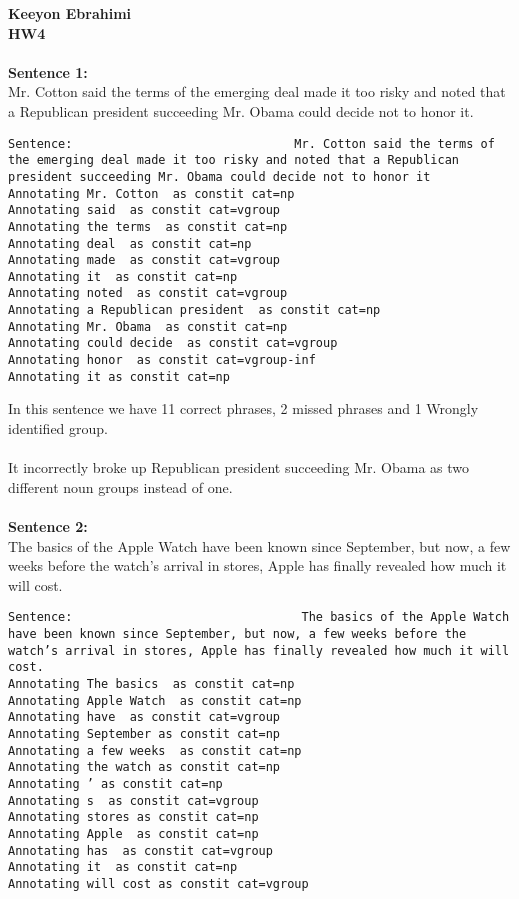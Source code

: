 \documentclass{article}
\begin{document}
\textbf{Keeyon Ebrahimi}\\
\textbf{HW4}
\\ \\
\textbf{Sentence 1: } \\
Mr. Cotton said the terms of the emerging deal made it too risky and noted that a Republican president succeeding Mr. Obama could decide not to honor it.
\begin{verbatim}
Sentence:                               Mr. Cotton said the terms of the emerging deal made it too risky and noted that a Republican president succeeding Mr. Obama could decide not to honor it
Annotating Mr. Cotton  as constit cat=np
Annotating said  as constit cat=vgroup
Annotating the terms  as constit cat=np
Annotating deal  as constit cat=np
Annotating made  as constit cat=vgroup
Annotating it  as constit cat=np
Annotating noted  as constit cat=vgroup
Annotating a Republican president  as constit cat=np
Annotating Mr. Obama  as constit cat=np
Annotating could decide  as constit cat=vgroup
Annotating honor  as constit cat=vgroup-inf
Annotating it as constit cat=np

\end{verbatim}
In this sentence we have 11 correct phrases, 2 missed phrases and 1 Wrongly identified group.
\\ \\
It incorrectly broke up Republican president succeeding Mr. Obama as two different noun groups instead of one.
\\
\\
\textbf{Sentence 2: }\\
 The basics of the Apple Watch have been known since September, but now, a few weeks before the watch’s arrival in stores, Apple has finally revealed how much it will cost.
\begin{verbatim}
Sentence:                                The basics of the Apple Watch have been known since September, but now, a few weeks before the watch’s arrival in stores, Apple has finally revealed how much it will cost.
Annotating The basics  as constit cat=np
Annotating Apple Watch  as constit cat=np
Annotating have  as constit cat=vgroup
Annotating September as constit cat=np
Annotating a few weeks  as constit cat=np
Annotating the watch as constit cat=np
Annotating ’ as constit cat=np
Annotating s  as constit cat=vgroup
Annotating stores as constit cat=np
Annotating Apple  as constit cat=np
Annotating has  as constit cat=vgroup
Annotating it  as constit cat=np
Annotating will cost as constit cat=vgroup
\end{verbatim}
\end{document}
